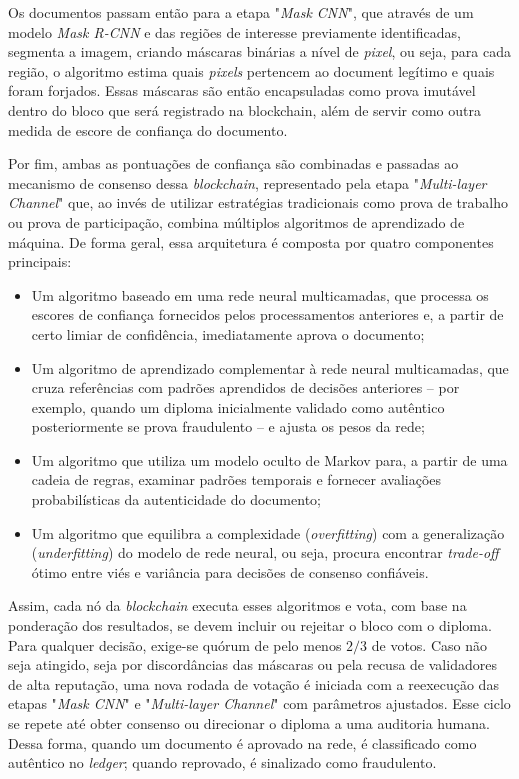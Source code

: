Os documentos passam então para a etapa "\textit{Mask CNN}", que através de um modelo \textit{Mask R-CNN} e das regiões de interesse previamente identificadas, segmenta a imagem, criando máscaras binárias a nível de \textit{pixel}, ou seja, para cada região, o algoritmo estima quais \textit{pixels} pertencem ao document legítimo e quais foram forjados. Essas máscaras são então encapsuladas como prova imutável dentro do bloco que será registrado na blockchain, além de servir como outra medida de escore de confiança do documento.

Por fim, ambas as pontuações de confiança são combinadas e passadas ao mecanismo de consenso dessa \textit{blockchain}, representado pela etapa "\textit{Multi-layer Channel}" que, ao invés de utilizar estratégias tradicionais como prova de trabalho ou prova de participação, combina múltiplos algoritmos de aprendizado de máquina. De forma geral, essa arquitetura é composta por quatro componentes principais:

\begin{itemize}
    \item Um algoritmo baseado em uma rede neural multicamadas, que processa os escores de confiança fornecidos pelos processamentos anteriores e, a partir de certo limiar de confidência, imediatamente aprova o documento;
    \item Um algoritmo de aprendizado complementar à rede neural multicamadas, que cruza referências com padrões aprendidos de decisões anteriores -- por exemplo, quando um diploma inicialmente validado como autêntico posteriormente se prova fraudulento -- e ajusta os pesos da rede;
    \item Um algoritmo que utiliza um modelo oculto de Markov para, a partir de uma cadeia de regras, examinar padrões temporais e fornecer avaliações probabilísticas da autenticidade do documento;
    \item Um algoritmo que equilibra a complexidade (\textit{overfitting}) com a generalização (\textit{underfitting}) do modelo de rede neural, ou seja, procura encontrar \textit{trade-off} ótimo entre viés e variância para decisões de consenso confiáveis.
\end{itemize}

Assim, cada nó da \textit{blockchain} executa esses algoritmos e vota, com base na ponderação dos resultados, se devem incluir ou rejeitar o bloco com o diploma. Para qualquer decisão, exige-se quórum de pelo menos $2/3$ de votos. Caso não seja atingido, seja por discordâncias das máscaras ou pela recusa de validadores de alta reputação, uma nova rodada de votação é iniciada com a reexecução das etapas "\textit{Mask CNN}" e "\textit{Multi-layer Channel}" com parâmetros ajustados. Esse ciclo se repete até obter consenso ou direcionar o diploma a uma auditoria humana. Dessa forma, quando um documento é aprovado na rede, é classificado como autêntico no \textit{ledger}; quando reprovado, é sinalizado como fraudulento.

